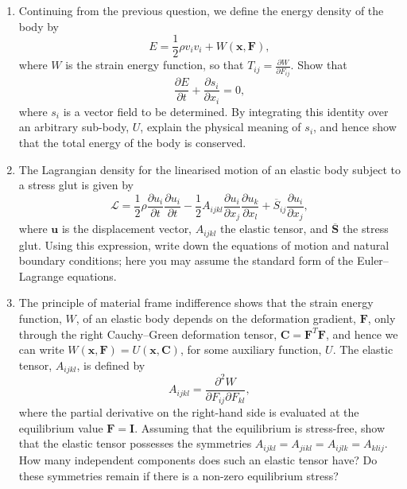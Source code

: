 \begin{enumerate}
\item Continuing from the previous question, we define the energy density of the body by
\begin{equation*}
    E=\frac{1}{2}\rho v_{i}v_{i}+W(\mathbf{x},\mathbf{F}),
\end{equation*}
where $W$ is the strain energy function, so that $T_{ij}=\frac{\partial W}{\partial F_{ij}}$. Show that
\begin{equation*}
    \frac{\partial E}{\partial t}+\frac{\partial s_{i}}{\partial x_{i}}=0,
\end{equation*}
where $s_{i}$ is a vector field to be determined. By integrating this identity over an arbitrary sub-body, $U$, explain the physical meaning of $s_{i}$, and hence show that the total energy of the body is conserved.

\item The Lagrangian density for the linearised motion of an elastic body subject to a stress glut is given by
\begin{equation*}
    \mathcal{L}=\frac{1}{2}\rho\frac{\partial u_{i}}{\partial t}\frac{\partial u_{i}}{\partial t}-\frac{1}{2}A_{ijkl}\frac{\partial u_{i}}{\partial x_{j}}\frac{\partial u_{k}}{\partial x_{l}}+\overline{S}_{ij}\frac{\partial u_{i}}{\partial x_{j}},
\end{equation*}
where $\mathbf{u}$ is the displacement vector, $A_{ijkl}$ the elastic tensor, and $\overline{\mathbf{S}}$ the stress glut. Using this expression, write down the equations of motion and natural boundary conditions; here you may assume the standard form of the Euler--Lagrange equations.

\item The principle of material frame indifference shows that the strain energy function, $W$, of an elastic body depends on the deformation gradient, $\mathbf{F}$, only through the right Cauchy--Green deformation tensor, $\mathbf{C}=\mathbf{F}^{T}\mathbf{F}$, and hence we can write $W(\mathbf{x},\mathbf{F})=U(\mathbf{x},\mathbf{C})$, for some auxiliary function, $U$. The elastic tensor, $A_{ijkl}$, is defined by
\begin{equation*}
    A_{ijkl}=\frac{\partial^{2}W}{\partial F_{ij}\partial F_{kl}},
\end{equation*}
where the partial derivative on the right-hand side is evaluated at the equilibrium value $\mathbf{F}=\mathbf{I}$. Assuming that the equilibrium is stress-free, show that the elastic tensor possesses the symmetries $A_{ijkl}=A_{jikl}=A_{ijlk}=A_{klij}$.
How many independent components does such an elastic tensor have? Do these symmetries remain if there is a non-zero equilibrium stress?


\end{enumerate}
